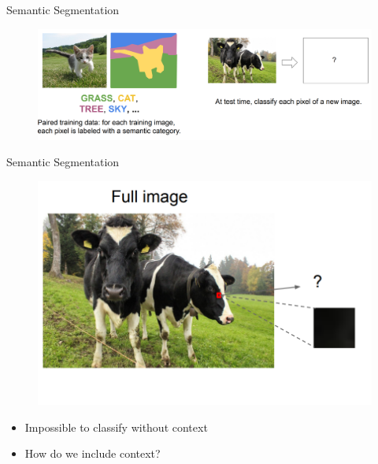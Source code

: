 \documentclass[10pt]{beamer}
\theoremstyle{remark}
\theoremstyle{definition}
\begin{document}
\begin{frame}{Semantic Segmentation}
\begin{figure}
\centering
\includegraphics[width=1.0\textwidth,height=1.0\textheight,keepaspectratio]{./images/sem_1.png}
\end{figure}
    
\end{frame}

\begin{frame}{Semantic Segmentation}
\begin{figure}
\centering
\includegraphics[width=1.0\textwidth,height=0.7\textheight,keepaspectratio]{./images/sem_2.png}
\end{figure}
\pause

\begin{itemize}
    \item Impossible to classify without context
    \item How do we include context?
\end{itemize}
\end{frame}
\end{document}
